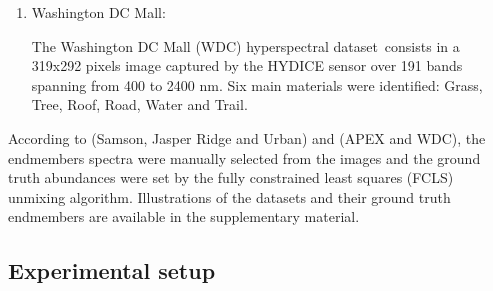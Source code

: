 \begin{enumerate}
\item Washington DC Mall:
\addtocounter{footnote}{-1}
The Washington DC Mall (WDC) hyperspectral dataset\footnotemark~consists in a
319x292 pixels image captured by the HYDICE \cite{rickard_hydice_1993} sensor
over 191 bands spanning from 400 to 2400 nm.
Six main materials were identified: Grass, Tree, Roof, Road, Water and Trail.

\end{enumerate}

According to \cite{zhu_hyperspectral_2017} (Samson, Jasper Ridge and Urban) and
\cite{rasti_misicnet_2022} (APEX and WDC), the endmembers
spectra were manually selected from the images and the ground truth abundances
were set by the fully constrained least squares (FCLS) unmixing algorithm.
Illustrations of the datasets and their ground truth endmembers are available in
the supplementary material.

\subsection{Experimental setup}


